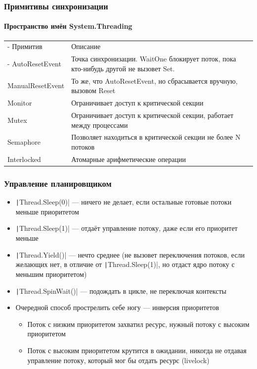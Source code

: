 \documentclass[xetex,mathserif,serif]{beamer}
\begin{document}
	\begin{frame}
		\frametitle{Примитивы синхронизации}
		\framesubtitle{Пространство имён System.Threading}
		\begin{footnotesize}
			\begin{tabu} {| X[0.3 l p] | X[1 l p] |}
				\tabucline-
				Примитив          & Описание           \\
				\tabucline-
				\everyrow{\tabucline-}
				AutoResetEvent    & Точка синхронизации. WaitOne блокирует поток, пока кто-нибудь другой не вызовет Set.  \\
				ManualResetEvent  & То же, что AutoResetEvent, но сбрасывается вручную, вызовом Reset                     \\
				Monitor           & Ограничивает доступ к критической секции                                              \\
				Mutex             & Ограничивает доступ к критической секции, работает между процессами                   \\
				Semaphore         & Позволяет находиться в критической секции не более N потоков                          \\
				Interlocked       & Атомарные арифметические операции                                                     \\
			\end{tabu}
		\end{footnotesize}
	\end{frame}

	\begin{frame}
		\frametitle{Управление планировщиком}
		\begin{small}
			\begin{itemize}
				\item \texttt|Thread.Sleep(0)| --- ничего не делает, если остальные готовые потоки меньше приоритетом
				\item \texttt|Thread.Sleep(1)| --- отдаёт управление потоку, даже если его приоритет меньше
				\item \texttt|Thread.Yield()| --- нечто среднее (не вызовет переключения потоков, если желающих нет, в отличие от \texttt|Thread.Sleep(1)|, но отдаст ядро потоку с меньшим приоритетом)
				\item \texttt|Thread.SpinWait()| --- подождать в цикле, не переключая контексты
				\item Очередной способ прострелить себе ногу --- инверсия приоритетов
				\begin{itemize}
					\item Поток с низким приоритетом захватил ресурс, нужный потоку с высоким приоритетом
					\item Поток с высоким приоритетом крутится в ожидании, никогда не отдавая управление потоку, который мог бы отдать ресурс (livelock)
				\end{itemize}
			\end{itemize}
		\end{small}
	\end{frame}
\end{document}
